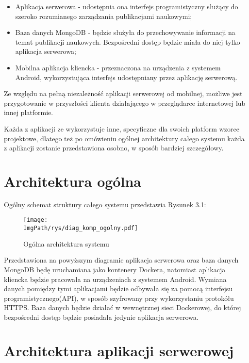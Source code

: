 \documentclass[a4paper,12pt,twoside,openany]{report}
\newcommand{\ImgPath}{.}
\begin{document}
\begin{itemize}
	\item Aplikacja serwerowa - udostępnia ona interfejs programistyczny służący do szeroko rozumianego zarządzania publikacjami naukowymi; 
	\item Baza danych MongoDB - będzie służyła do przechowywanie informacji na temat publikacji naukowych. Bezpośredni dostęp będzie miała do niej tylko aplikacja serwerowa;
	\item Mobilna aplikacja kliencka - przeznaczona na urządzenia z systemem Android, wykorzystująca interfejs udostępniany przez aplikację serwerową.
\end{itemize}

Ze względu na pełną niezależność aplikacji serwerowej od mobilnej, możliwe jest przygotowanie w przyszłości klienta działającego w przeglądarce internetowej lub innej platformie. 

Każda z aplikacji ze wykorzystuje inne, specyficzne dla swoich platform wzorce projektowe, dlatego też po omówieniu ogólnej architektury całego systemu  każda z aplikacji zostanie przedstawiona osobno, w sposób bardziej szczegółowy. 

\newpage
\section{Architektura ogólna}
Ogólny schemat struktury całego systemu przedstawia Rysunek 3.1:

 \begin{figure}[!htbp]
 	\begin{center}
 		\centering
 		\texttt{[image: \\ImgPath/rys/diag\_komp\_ogolny.pdf]}
 	\end{center}
 	\caption{Ogólna architektura systemu}
 	\label{ogolnaArchitektura}
 \end{figure}
 Przedstawiona na powyższym diagramie aplikacja serwerowa oraz baza danych MongoDB będę uruchamiana jako kontenery Dockera, natomiast aplikacja kliencka będzie pracowała na urządzeniach z systemem Android. Wymiana danych pomiędzy tymi aplikacjami będzie odbywała się za pomocą interfejsu programistycznego(API), w sposób szyfrowany przy wykorzystaniu protokółu HTTPS.
 Baza danych będzie działać w wewnętrznej sieci Dockerowej, do której bezpośredni dostęp będzie posiadała jedynie aplikacja serwerowa. 

\section{Architektura aplikacji serwerowej}
\end{document}
